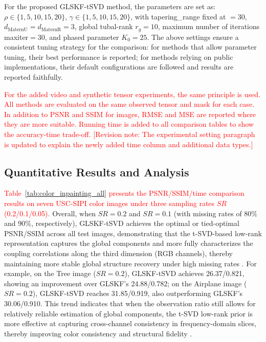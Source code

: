 \documentclass[a4paper,12pt]{article}
\numberwithin{equation}{section}
\numberwithin{algorithm}{section}
\newcommand{\rev}[1]{\textcolor{red}{#1}}
\newcommand{\revnote}[1]{\textcolor{red}{[Revision note: #1]}}
\theoremstyle{remark}
\theoremstyle{definition}
\begin{document}
For the proposed GLSKF-tSVD method, the parameters are set as: $\rho\in\{1,5,10,15,20\}$, $\gamma\in\{1,5,10,15,20\}$,
with tapering\_range fixed at $=30$, $d_{\text{MaternU}}=d_{\text{MaternR}}=3$,
global tubal-rank $r_g=10$, maximum number of iterations maxiter$=30$, and phased parameter $K_0=25$.
The above settings ensure a consistent tuning strategy for the comparison: for methods that allow parameter tuning, their best performance is reported; for methods relying on public implementations, their default configurations are followed and results are reported faithfully.

\rev{For the added video and synthetic tensor experiments, the same principle is used. All methods are evaluated on the same observed tensor and mask for each case. In addition to PSNR and SSIM for images, RMSE and MSE are reported where they are more suitable. Running time is added to all comparison tables to show the accuracy-time trade-off.} \revnote{The experimental setting paragraph is updated to explain the newly added time column and additional data types.}


\subsection{Quantitative Results and Analysis}  
\rev{Table~\ref{tab:color_inpainting_all} presents the PSNR/SSIM/time comparison results on seven USC-SIPI color images under three sampling rates $SR$ (0.2/0.1/0.05).}  
Overall, when $SR=0.2$ and $SR=0.1$ (with missing rates of $80\%$ and $90\%$, respectively), GLSKF-tSVD achieves the optimal or tied-optimal PSNR/SSIM across all test images, demonstrating that the t-SVD-based low-rank representation captures the global components and more fully characterizes the coupling correlations along the third dimension (RGB channels), thereby maintaining more stable global structure recovery under high missing rates \cite{kilmer2013operators}.  
For example, on the Tree image ($SR=0.2$), GLSKF-tSVD achieves 26.37/0.821, showing an improvement over GLSKF’s 24.88/0.782; on the Airplane image ($SR=0.2$), GLSKF-tSVD reaches 31.85/0.919, also outperforming GLSKF’s 30.06/0.910.  
This trend indicates that when the observation ratio still allows for relatively reliable estimation of global components, the t-SVD low-rank prior is more effective at capturing cross-channel consistency in frequency-domain slices, thereby improving color consistency and structural fidelity \cite{zhang2017tsvd}.
\end{document}
